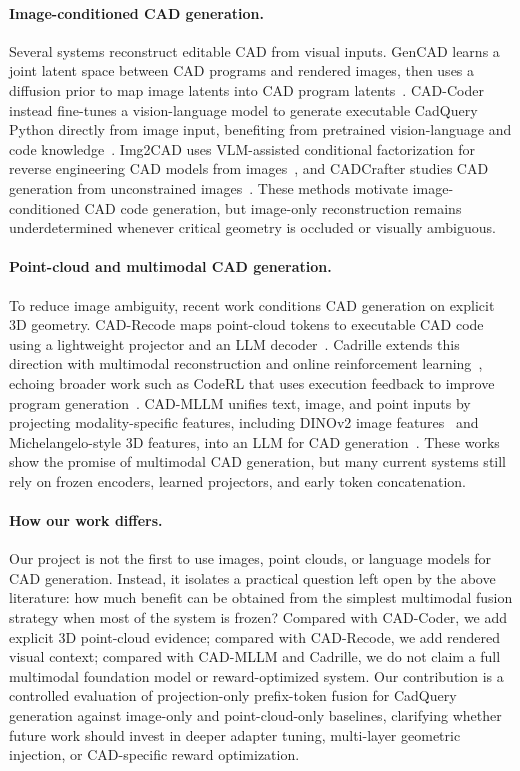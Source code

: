 \documentclass{article}
\begin{document}
\paragraph{Image-conditioned CAD generation.}
Several systems reconstruct editable CAD from visual inputs. GenCAD learns a joint latent space between CAD programs and rendered images, then uses a diffusion prior to map image latents into CAD program latents~\cite{alam2024gencad}. CAD-Coder instead fine-tunes a vision-language model to generate executable CadQuery Python directly from image input, benefiting from pretrained vision-language and code knowledge~\cite{cadcoder}. Img2CAD uses VLM-assisted conditional factorization for reverse engineering CAD models from images~\cite{img2cad}, and CADCrafter studies CAD generation from unconstrained images~\cite{cadcrafter}. These methods motivate image-conditioned CAD code generation, but image-only reconstruction remains underdetermined whenever critical geometry is occluded or visually ambiguous.

\paragraph{Point-cloud and multimodal CAD generation.}
To reduce image ambiguity, recent work conditions CAD generation on explicit 3D geometry. CAD-Recode maps point-cloud tokens to executable CAD code using a lightweight projector and an LLM decoder~\cite{cadrecode,rukhovich2025cad}. Cadrille extends this direction with multimodal reconstruction and online reinforcement learning~\cite{kolodiazhnyi2025cadrille}, echoing broader work such as CodeRL that uses execution feedback to improve program generation~\cite{le2022coderl}. CAD-MLLM unifies text, image, and point inputs by projecting modality-specific features, including DINOv2 image features~\cite{oquab2023dinov2} and Michelangelo-style 3D features, into an LLM for CAD generation~\cite{cadmllm}. These works show the promise of multimodal CAD generation, but many current systems still rely on frozen encoders, learned projectors, and early token concatenation.

\paragraph{How our work differs.}
Our project is not the first to use images, point clouds, or language models for CAD generation. Instead, it isolates a practical question left open by the above literature: how much benefit can be obtained from the simplest multimodal fusion strategy when most of the system is frozen? Compared with CAD-Coder, we add explicit 3D point-cloud evidence; compared with CAD-Recode, we add rendered visual context; compared with CAD-MLLM and Cadrille, we do not claim a full multimodal foundation model or reward-optimized system. Our contribution is a controlled evaluation of projection-only prefix-token fusion for CadQuery generation against image-only and point-cloud-only baselines, clarifying whether future work should invest in deeper adapter tuning, multi-layer geometric injection, or CAD-specific reward optimization.
\end{document}
